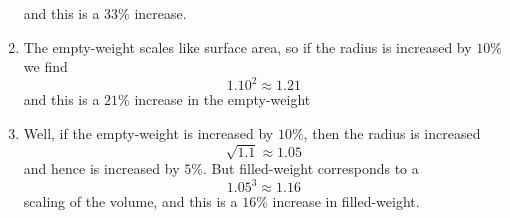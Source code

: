 \documentclass[nooutcomes,noauthor,handout]{ximera}
\begin{document}
\begin{question}
\begin{freeResponse}
\begin{enumerate}
\[    \]
    and this is a $33\%$ increase.
  \item The empty-weight scales like surface area, so if the radius is
    increased by $10\%$ we find
    \[
    1.10^2 \approx 1.21
    \]
    and this is a $21\%$ increase in the empty-weight
  \item Well, if the empty-weight is increased by $10\%$, then the
    radius is increased
    \[
    \sqrt{1.1} \approx 1.05
    \]
    and hence is increased by $5\%$. But filled-weight corresponds to
    a
    \[
    1.05^3 \approx 1.16
    \]
    scaling of the volume, and this is a $16\%$ increase in filled-weight.
  \end{enumerate}
\end{freeResponse}

\end{question}
\end{document}
